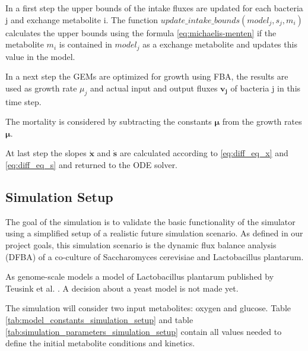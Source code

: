 In a first step the upper bounds of the intake fluxes are updated for each bacteria j and exchange metabolite i.
The function $update\_intake\_bounds(model_j, s_j, m_i)$ calculates the upper bounds using the formula \ref{eq:michaelis-menten} if
the metabolite $m_i$ is contained in $model_j$ as a exchange metabolite and updates this value in the model.

In a next step the GEMs are optimized for growth using FBA, the results are used as growth rate $\mu_j$ and actual input and output
fluxes $\bm{v_j}$ of bacteria j in this time step.

The mortality is considered by subtracting the constants $\bm{\mu}$ from the growth rates $\bm{\mu}$.

At last step the slopes $\dot{\bm{x}}$ and $\bm{\dot{s}}$ are calculated according to \ref{eq:diff_eq_x} and \ref{eq:diff_eq_s} and
returned to the ODE solver.


\subsection{Simulation Setup}\label{ssec:simulation_setup}

The goal of the simulation is to validate the basic functionality of the simulator using a simplified setup of a realistic future
simulation scenario. As defined in our project goals, this simulation scenario is the dynamic flux balance analysis (DFBA) of a
co-culture of Saccharomyces cerevisiae and Lactobacillus plantarum.

As genome-scale models a model of Lactobacillus plantarum published by Teusink et al. \cite{teusink_analysis_2006}. A decision about
a yeast model is not made yet.

The simulation will consider two input metabolites: oxygen and glucose. Table \ref{tab:model_constants_simulation_setup} and table
\ref{tab:simulation_parameters_simulation_setup} contain all values needed to define the initial metabolite conditions and kinetics.

